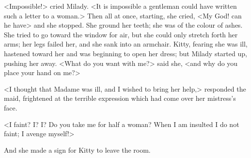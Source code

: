 <Impossible!> cried Milady. <It is impossible a gentleman could have written such a letter to a woman.> Then all at once, starting, she cried, <My God! can he have\longdash> and she stopped. She ground her teeth; she was of the colour of ashes. She tried to go toward the window for air, but she could only stretch forth her arms; her legs failed her, and she sank into an armchair. Kitty, fearing she was ill, hastened toward her and was beginning to open her dress; but Milady started up, pushing her away. <What do you want with me?> said she, <and why do you place your hand on me?> 

<I thought that Madame was ill, and I wished to bring her help,> responded the maid, frightened at the terrible expression which had come over her mistress's face. 

<I faint? I? I? Do you take me for half a woman? When I am insulted I do not faint; I avenge myself!> 

And she made a sign for Kitty to leave the room. 